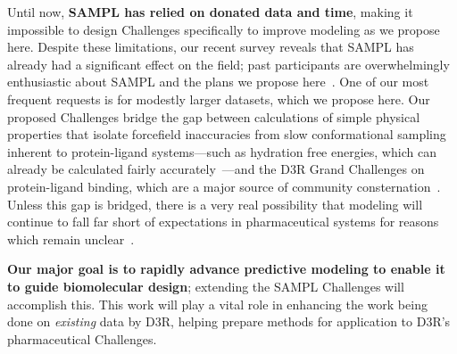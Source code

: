 \documentclass[11pt]{article}
\begin{document}
Until now, \textbf{SAMPL has relied on donated data and time}, making it impossible to design Challenges specifically to improve modeling as we propose here. 
Despite these limitations, our recent survey reveals that SAMPL has already had a significant effect on the field; past participants are overwhelmingly enthusiastic about SAMPL and the plans we propose here~\cite{Mobley:2017:eScholarship}.
One of our most frequent requests is for modestly larger datasets, which we propose here. 
Our proposed Challenges bridge the gap between calculations of simple physical properties that isolate forcefield inaccuracies from slow conformational sampling inherent to protein-ligand systems---such as hydration free energies, which can already be calculated fairly accurately~\cite{mobley_blind_2014-1}---and the D3R Grand Challenges on protein-ligand binding, which are a major source of community consternation~\cite{ignjatovic_binding-affinity_2016, deng_large_2016, sunseri_d3r_2016, Gathiaka:2016:JComputAidedMolDes}.
Unless this gap is bridged, there is a very real possibility that modeling will continue to fall far short of expectations in pharmaceutical systems for reasons which remain unclear~\cite{Sherborne:2016:JComputAidedMolDes}.

\textbf{Our major goal is to rapidly advance predictive modeling to enable it to guide biomolecular design}; extending the SAMPL Challenges will accomplish this.
This work will play a vital role in enhancing the work being done on \emph{existing} data by D3R, helping prepare methods for application to D3R's pharmaceutical Challenges. 
\end{document}
